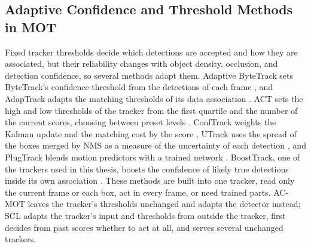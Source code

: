 \subsection{Adaptive Confidence and Threshold Methods in MOT}\label{sec:rw-thresholds}
Fixed tracker thresholds decide which detections are accepted and how they are associated, but their reliability changes with object density, occlusion, and detection confidence, so several methods adapt them. Adaptive ByteTrack sets ByteTrack's confidence threshold from the detections of each frame \cite{ma2023adaptivebytetrack}, and AdapTrack adapts the matching thresholds of its data association \cite{shim2024adaptrack}. ACT sets the high and low thresholds of the tracker from the first quartile and the number of the current scores, choosing between preset levels \cite{act2026adaptive}. ConfTrack weights the Kalman update and the matching cost by the score \cite{jung2024conftrack}, UTrack uses the spread of the boxes merged by NMS as a measure of the uncertainty of each detection \cite{solano2025utrack}, and PlugTrack blends motion predictors with a trained network \cite{kim2026plugtrack}. BoostTrack, one of the trackers used in this thesis, boosts the confidence of likely true detections inside its own association \cite{stanojevic2024boosttrack}. These methods are built into one tracker, read only the current frame or each box, act in every frame, or need trained parts. AC-MOT leaves the tracker's thresholds unchanged and adapts the detector instead; SCL adapts the tracker's input and thresholds from outside the tracker, first decides from past scores whether to act at all, and serves several unchanged trackers.

